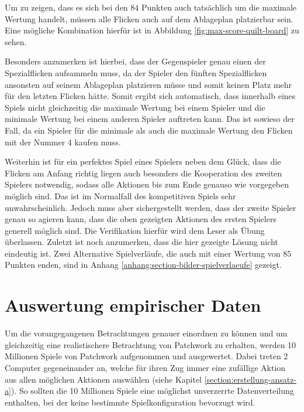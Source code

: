 Um zu zeigen, dass es sich bei den $84$ Punkten auch tatsächlich um die maximale Wertung handelt, müssen alle Flicken auch auf dem Ablageplan platzierbar sein. Eine mögliche Kombination hierfür ist in Abbildung \ref{fig:max-score-quilt-board} zu sehen.

Besonders anzumerken ist hierbei, dass der Gegenspieler genau einen der Spezialflicken aufsammeln muss, da der Spieler den fünften Spezialflicken ansonsten auf seinem Ablageplan platzieren müsse und somit keinen Platz mehr für den letzten Flicken hätte. Somit ergibt sich automatisch, dass innerhalb eines Spiels nicht gleichzeitig die maximale Wertung bei einem Spieler und die minimale Wertung bei einem anderen Spieler auftreten kann. Das ist sowieso der Fall, da ein Spieler für die minimale als auch die maximale Wertung den Flicken mit der Nummer 4 kaufen muss.

Weiterhin ist für ein perfektes Spiel eines Spielers neben dem Glück, dass die Flicken am Anfang richtig liegen auch besonders die Kooperation des zweiten Spielers notwendig, sodass alle Aktionen bis zum Ende genauso wie vorgegeben möglich sind. Das ist im Normalfall des kompetitiven Spiels sehr unwahrscheinlich. Jedoch muss aber sichergestellt werden, dass der zweite Spieler genau so agieren kann, dass die oben gezeigten Aktionen des ersten Spielers generell möglich sind. Die Verifikation hierfür wird dem Leser als Übung überlassen. Zuletzt ist noch anzumerken, dass die hier gezeigte Lösung nicht eindeutig ist. Zwei Alternative Spielverläufe, die auch mit einer Wertung von $85$ Punkten enden, sind in Anhang \ref{anhang:section-bilder-spielverlaeufe} gezeigt.

\pagebreak

\section{Auswertung empirischer Daten}
\label{section:auswertung-empirischer-daten}

Um die vorangegangenen Betrachtungen genauer einordnen zu können und um gleichzeitig eine realistischere Betrachtung von Patchwork zu erhalten, werden 10 Millionen Spiele von Patchwork aufgenommen und ausgewertet. Dabei treten 2 Computer gegeneinander an, welche für ihren Zug immer eine zufällige Aktion aus allen möglichen Aktionen auswählen (siehe Kapitel \ref{section:erstellung-ansatz-a}). So sollten die 10 Millionen Spiele eine möglichst unverzerrte Datenverteilung enthalten, bei der keine bestimmte Spielkonfiguration bevorzugt wird.

